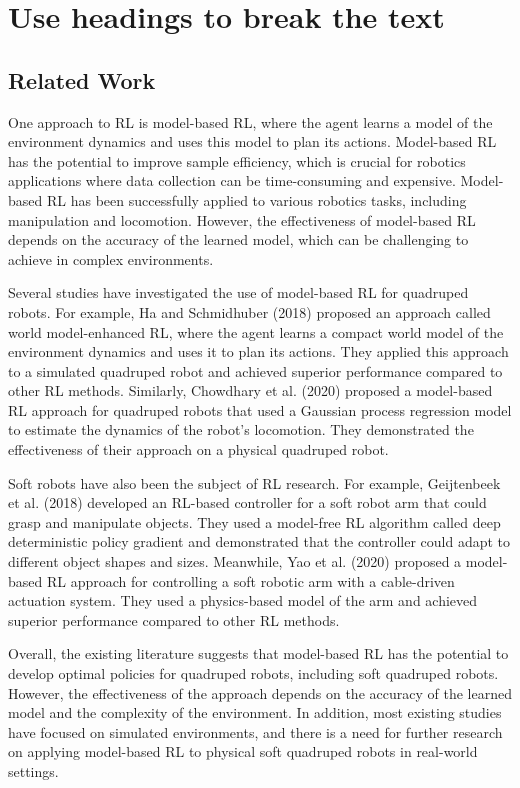 \section{Use headings to break the text}


\subsection{Related Work}

One approach to RL is model-based RL, where the agent learns a model of the environment dynamics and uses this model to plan its actions. Model-based RL has the potential to improve sample efficiency, which is crucial for robotics applications where data collection can be time-consuming and expensive. Model-based RL has been successfully applied to various robotics tasks, including manipulation and locomotion. However, the effectiveness of model-based RL depends on the accuracy of the learned model, which can be challenging to achieve in complex environments.

Several studies have investigated the use of model-based RL for quadruped robots. For example, Ha and Schmidhuber (2018) proposed an approach called world model-enhanced RL, where the agent learns a compact world model of the environment dynamics and uses it to plan its actions. They applied this approach to a simulated quadruped robot and achieved superior performance compared to other RL methods. Similarly, Chowdhary et al. (2020) proposed a model-based RL approach for quadruped robots that used a Gaussian process regression model to estimate the dynamics of the robot's locomotion. They demonstrated the effectiveness of their approach on a physical quadruped robot.

Soft robots have also been the subject of RL research. For example, Geijtenbeek et al. (2018) developed an RL-based controller for a soft robot arm that could grasp and manipulate objects. They used a model-free RL algorithm called deep deterministic policy gradient and demonstrated that the controller could adapt to different object shapes and sizes. Meanwhile, Yao et al. (2020) proposed a model-based RL approach for controlling a soft robotic arm with a cable-driven actuation system. They used a physics-based model of the arm and achieved superior performance compared to other RL methods.

Overall, the existing literature suggests that model-based RL has the potential to develop optimal policies for quadruped robots, including soft quadruped robots. However, the effectiveness of the approach depends on the accuracy of the learned model and the complexity of the environment. In addition, most existing studies have focused on simulated environments, and there is a need for further research on applying model-based RL to physical soft quadruped robots in real-world settings.
